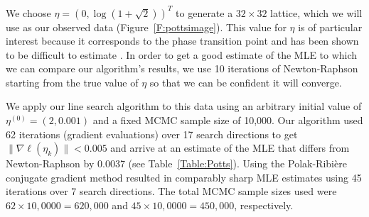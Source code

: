 We choose $\eta = \left(0, \log(1 + \sqrt{2} ) \right)^T$ to generate a $32 \times 32$ 
lattice, which we will use as 
our observed data (Figure~\ref{F:pottsimage}).  This value for $\eta$ is of particular 
interest because it corresponds 
to the phase transition point \citep{Potts} and has been shown to be difficult to 
estimate \citep{Geyer:1990}.  In 
order to get a good estimate of the MLE to which we can compare our algorithm's 
results, we use 10 iterations of Newton-Raphson starting 
from the true value of $\eta$ so that we can be confident it will converge.

%



We apply our line search algorithm to this data using an arbitrary initial value of $
\eta^{(0)} = ( 2, 0.001)$ and a 
fixed MCMC sample size of 10,000.  Our algorithm used 62 iterations (gradient 
evaluations) over 17 search directions to 
get  $\lVert \nabla \ell( \eta_k ) \rVert < 0.005$ and arrive at an estimate of the 
MLE that differs from Newton-Raphson
by 0.0037 (see Table~\ref{Table:Potts}).   Using the Polak-Ribi\`{e}re conjugate 
gradient method resulted in 
comparably sharp MLE estimates using 45 iterations over 7 search directions.  The 
total MCMC sample sizes used were $62\times10,0000 = 620,000$ and $45\times10,0000 = 
450,000$, respectively.




